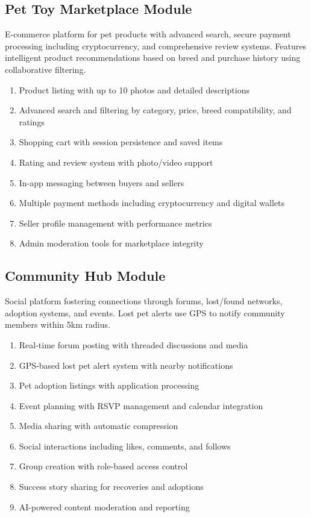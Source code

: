 \subsection{Pet Toy Marketplace Module}
E-commerce platform for pet products with advanced search, secure payment processing including cryptocurrency, and comprehensive review systems. Features intelligent product recommendations based on breed and purchase history using collaborative filtering.
\begin{enumerate}
    \item Product listing with up to 10 photos and detailed descriptions
    \item Advanced search and filtering by category, price, breed compatibility, and ratings
    \item Shopping cart with session persistence and saved items
    \item Rating and review system with photo/video support
    \item In-app messaging between buyers and sellers
    \item Multiple payment methods including cryptocurrency and digital wallets
    \item Seller profile management with performance metrics
    \item Admin moderation tools for marketplace integrity
\end{enumerate}

\subsection{Community Hub Module}
Social platform fostering connections through forums, lost/found networks, adoption systems, and events. Lost pet alerts use GPS to notify community members within 5km radius.
\begin{enumerate}
    \item Real-time forum posting with threaded discussions and media
    \item GPS-based lost pet alert system with nearby notifications
    \item Pet adoption listings with application processing
    \item Event planning with RSVP management and calendar integration
    \item Media sharing with automatic compression
    \item Social interactions including likes, comments, and follows
    \item Group creation with role-based access control
    \item Success story sharing for recoveries and adoptions
    \item AI-powered content moderation and reporting
\end{enumerate}

